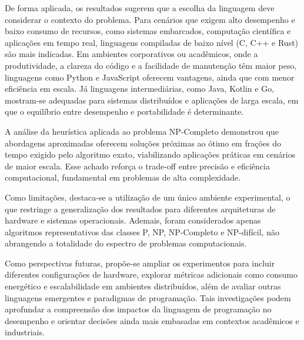 \documentclass[12pt, a4paper]{article}
\begin{document}
De forma aplicada, os resultados sugerem que a escolha da linguagem deve considerar o contexto do problema. Para cenários que exigem alto desempenho e baixo consumo de recursos, como sistemas embarcados, computação científica e aplicações em tempo real, linguagens compiladas de baixo nível (C, C++ e Rust) são mais indicadas. Em ambientes corporativos ou acadêmicos, onde a produtividade, a clareza do código e a facilidade de manutenção têm maior peso, linguagens como Python e JavaScript oferecem vantagens, ainda que com menor eficiência em escala. Já linguagens intermediárias, como Java, Kotlin e Go, mostram-se adequadas para sistemas distribuídos e aplicações de larga escala, em que o equilíbrio entre desempenho e portabilidade é determinante.

A análise da heurística aplicada ao problema NP-Completo demonstrou que abordagens aproximadas oferecem soluções próximas ao ótimo em frações do tempo exigido pelo algoritmo exato, viabilizando aplicações práticas em cenários de maior escala. Esse achado reforça o trade-off entre precisão e eficiência computacional, fundamental em problemas de alta complexidade.

Como limitações, destaca-se a utilização de um único ambiente experimental, o que restringe a generalização dos resultados para diferentes arquiteturas de hardware e sistemas operacionais. Ademais, foram considerados apenas algoritmos representativos das classes P, NP, NP-Completo e NP-difícil, não abrangendo a totalidade do espectro de problemas computacionais.

Como perspectivas futuras, propõe-se ampliar os experimentos para incluir diferentes configurações de hardware, explorar métricas adicionais como consumo energético e escalabilidade em ambientes distribuídos, além de avaliar outras linguagens emergentes e paradigmas de programação. Tais investigações podem aprofundar a compreensão dos impactos da linguagem de programação no desempenho e orientar decisões ainda mais embasadas em contextos acadêmicos e industriais.




\end{document}
